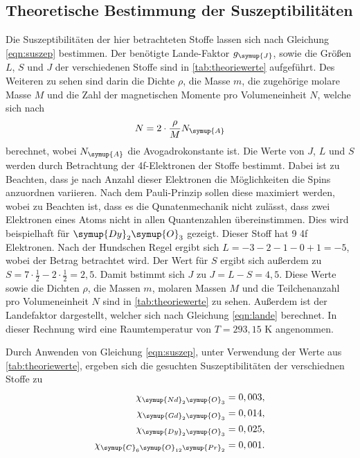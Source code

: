     \subsection{Theoretische Bestimmung der Suszeptibilitäten}
    Die Suszeptibilitäten der hier betrachteten Stoffe lassen sich nach Gleichung \eqref{eqn:suszep} bestimmen.
    Der benötigte Lande-Faktor $g_{\symup{J}}$, sowie die Größen $L$, $S$ und $J$ der verschiedenen Stoffe sind in \autoref{tab:theoriewerte}
    aufgeführt. Des Weiteren zu sehen sind darin die Dichte $\rho$, die Masse $m$, die zugehörige molare Masse $M$ und die Zahl der magnetischen
    Momente pro Volumeneinheit $N$, welche sich nach 
    \begin{equation}
    \label{eqn:N}
        N = 2 \cdot \frac{\rho}{M} N_{\symup{A}}
    \end{equation}
    berechnet, wobei $N_{\symup{A}}$ die Avogadrokonstante ist. Die Werte von $J$, $L$ und $S$ werden durch Betrachtung der 4f-Elektronen 
    der Stoffe bestimmt. Dabei ist zu Beachten, dass je nach Anzahl dieser Elektronen die Möglichkeiten die Spins anzuordnen variieren.
    Nach dem Pauli-Prinzip sollen diese maximiert werden, wobei zu Beachten ist, dass es die Qunatenmechanik nicht zulässt, dass zwei 
    Elektronen eines Atoms nicht in allen Quantenzahlen übereinstimmen. Dies wird beispielhaft für $\symup{Dy}_2\symup{O}_3$ gezeigt.
    Dieser Stoff hat 9 4f Elektronen. Nach der Hundschen Regel ergibt sich $L = -3-2-1-0+1 = -5$, wobei der Betrag betrachtet wird.
    Der Wert für $S$ ergibt sich außerdem zu $S = 7 \cdot \frac{1}{2} - 2 \cdot \frac{1}{2} = 2,5$.
     Damit bstimmt sich $J$ zu $J = L - S = 4,5$. Diese Werte sowie die Dichten $\rho$, die Massen $m$, molaren Massen $M$ und die 
    Teilchenanzahl pro Volumeneinheit $N$ sind in \autoref{tab:theoriewerte} zu sehen. Außerdem ist der Landefaktor dargestellt,
    welcher sich nach Gleichung \eqref{eqn:lande} berechnet. In dieser Rechnung wird eine Raumtemperatur von $T = 293,15$ K angenommen.

    
    Durch Anwenden von Gleichung \eqref{eqn:suszep}, unter Verwendung der Werte aus \autoref{tab:theoriewerte}, ergeben sich die gesuchten 
    Suszeptibilitäten der verschiednen Stoffe zu 
    \begin{align*}
        \chi_{\symup{Nd}_2\symup{O}_3} &= 0,003, \\
        \chi_{\symup{Gd}_2\symup{O}_3} &= 0,014, \\
        \chi_{\symup{Dy}_2\symup{O}_3} &= 0,025, \\
        \chi_{\symup{C}_6\symup{O}_{12}\symup{Pr}_2} &= 0,001. 
    \end{align*} 

